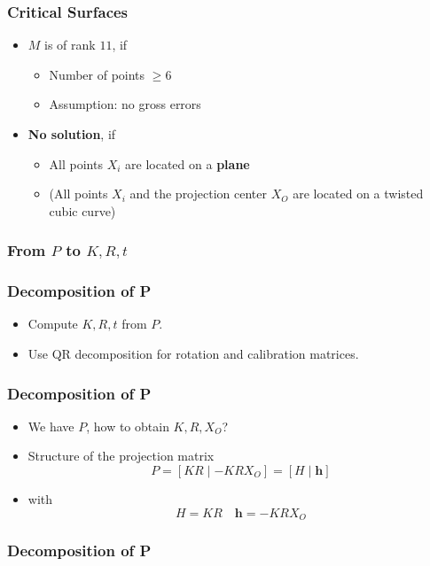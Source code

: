 \begin{frame}
  \frametitle{Critical Surfaces}
  \begin{itemize}
      \item $M$ is of rank $11$, if
      \begin{itemize}
          \item Number of points $\geq 6$
          \item Assumption: no gross errors
      \end{itemize}
      \item \textbf{No solution}, if
      \begin{itemize}
          \item All points $X_i$ are located on a \textbf{plane}
          \item (All points $X_i$ and the projection center $X_O$ are located on a twisted cubic curve)
      \end{itemize}
  \end{itemize}
\end{frame}

\begin{frame}
  \frametitle{From $P$ to $K,R,t$}
\end{frame}

\begin{frame}
  \frametitle{Decomposition of P}
  \begin{itemize}
    \item Compute $K, R, t$ from $P$.
    \item Use QR decomposition for rotation and calibration matrices.
  \end{itemize}
\end{frame}


\begin{frame}
  \frametitle{Decomposition of P}
  \begin{itemize}
      \item We have $P$, how to obtain $K, R, X_O$?
      \item Structure of the projection matrix
      $$P = [KR \mid -KRX_O] = [H \mid \mathbf{h}]$$
      \item with
      $$H = KR \quad \mathbf{h} = -KRX_O$$
  \end{itemize}
\end{frame}

\begin{frame}
  \frametitle{Decomposition of P}

\end{frame}

